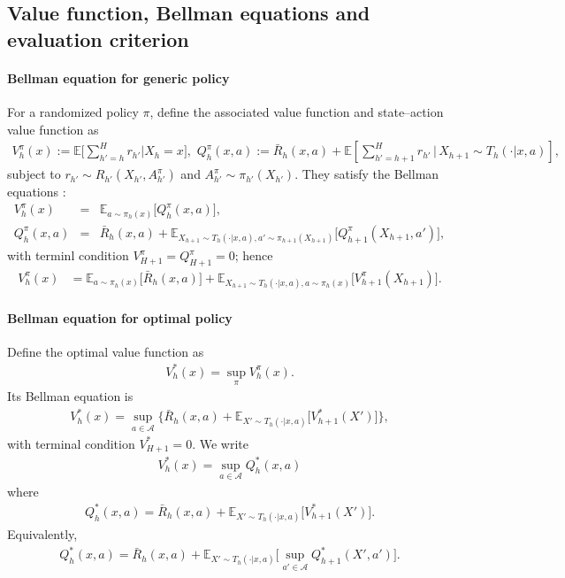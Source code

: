 \documentclass[final,supplement]{siamart251216}
\begin{document}
\subsection{Value function, Bellman equations and evaluation criterion}


\paragraph{Bellman equation for generic policy} 
For a randomized policy $\pi$, define the associated value function and state--action value function as
\begin{eqnarray*}
    V_h^\pi (x) := \mathbb{E} \Bigg[ \sum_{h'=h}^H r_{h'}
    \Bigg|X_h=x\Bigg], \,\,
    Q_h^\pi(x,a) := \bar{R}_h(x,a) + \mathbb{E}\left[ \sum_{h'=h+1}^H r_{h'}\,\Bigg|\,X_{h+1}\sim T_h(\cdot|x,a)\right], 
\end{eqnarray*}
subject to $r_{h'}\sim R_{h'}(X_{h'},A_{h'}^\pi)$ and $A_{h'}^\pi\sim\pi_{h'}(X_{h'})$. They satisfy the Bellman equations \cite{puterman2014markov}:
\begin{eqnarray}
     V_{h}^{\pi}(x) &=&\mathbb{E}_{a\sim \pi_h(x)} \Big[Q_{h}^{\pi}(x,a)\Big], \nonumber\\
        Q_{h}^{\pi}(x,a) & =&\bar{R}_{h}(x,a)+\mathbb{E}_{X_{h+1}\sim T_h(\cdot|x,a), a'\sim\pi_{h+1}(X_{h+1})}\Big[Q_{h+1}^{\pi}(X_{h+1},a')\Big], \label{eq:bellman}
\end{eqnarray}
with terminl condition $V_{H+1}^{\pi}=Q_{H+1}^{\pi}=0$; hence
\begin{eqnarray*}
       V_{h}^{\pi}(x) & = \mathbb{E}_{a\sim \pi_{h}(x)}\Big[\bar{R}_{h}(x,a)\Big]+\mathbb{E}_{X_{h+1}\sim T_h(\cdot|x,a), a\sim \pi_h(x)}\Big[V_{h+1}^{\pi}(X_{h+1}) \Big]. 
\end{eqnarray*}


\paragraph{Bellman equation for optimal policy} 
Define the optimal value function as
\begin{eqnarray}\label{eq:optimal_value_def}
    V_h^*(x) = \sup_{\pi} V_h^{\pi}(x).
\end{eqnarray}
Its Bellman equation is
\begin{eqnarray}\label{eq:bellman V star}
 V_h^*(x) = \sup_{a\in \mathcal{A}} \Big\{ \bar{R}_h(x,a) + \mathbb{E}_{X'\sim T_h(\cdot|x,a)}\Big[V_{h+1}^*(X')\Big] \Big\},   
\end{eqnarray}
with terminal condition $V^*_{H+1}=0$. We write
\begin{eqnarray*}
    V_h^*(x) = \sup_{a\in \mathcal{A}} Q_h^*(x,a)
\end{eqnarray*}
where
\begin{eqnarray}\label{eq:bellman Q star}
     Q^*_h(x,a) = \bar{R}_h(x,a)+ \mathbb{E}_{X'\sim T_h(\cdot|x,a)}\Big[V_{h+1}^*(X')\Big].
\end{eqnarray}
Equivalently,
\begin{eqnarray*}
    Q^*_h(x,a) = \bar{R}_h(x,a) + \mathbb{E}_{X'\sim T_h(\cdot|x,a)}\Big[\sup_{a'\in \mathcal{A}}Q_{h+1}^*(X',a')\Big].
\end{eqnarray*}
\end{document}
